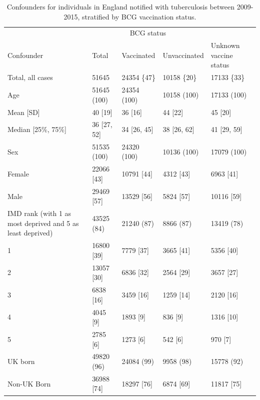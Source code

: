 \documentclass[11pt,twoside]{bristolthesis}
\begin{document}
  \begin{table}[!h]
  
  \caption{\label{tab:06-demo-sum}Confounders for individuals in England notified with tuberculosis between 2009-2015,  stratified by BCG vaccination status.}
  \centering
  \fontsize{8}{10}\selectfont
  \begin{tabular}{>{\raggedright\arraybackslash}p{2cm}llll}
  \toprule
  \multicolumn{2}{c}{ } & \multicolumn{3}{c}{BCG status} \\
  \cmidrule(l{3pt}r{3pt}){3-5}
  Confounder & Total & Vaccinated & Unvaccinated & Unknown vaccine status\\
  \midrule
  Total, all cases & 51645 & 24354 \{47\} & 10158 \{20\} & 17133 \{33\}\\
  Age & 51645 (100) & 24354 (100) & 10158 (100) & 17133 (100)\\
  Mean [SD] & 40 [19] & 36 [16] & 44 [22] & 45 [20]\\
  Median [25\%, 75\%] & 36 [27, 52] & 34 [26, 45] & 38 [26, 62] & 41 [29, 59]\\
  Sex & 51535 (100) & 24320 (100) & 10136 (100) & 17079 (100)\\
  \addlinespace
  \hspace{1em}Female & 22066 [43] & 10791 [44] & 4312 [43] & 6963 [41]\\
  \hspace{1em}Male & 29469 [57] & 13529 [56] & 5824 [57] & 10116 [59]\\
  IMD rank (with 1 as most deprived and 5 as least deprived) & 43525 (84) & 21240 (87) & 8866 (87) & 13419 (78)\\
  \hspace{1em}1 & 16800 [39] & 7779 [37] & 3665 [41] & 5356 [40]\\
  \hspace{1em}2 & 13057 [30] & 6836 [32] & 2564 [29] & 3657 [27]\\
  \addlinespace
  \hspace{1em}3 & 6838 [16] & 3459 [16] & 1259 [14] & 2120 [16]\\
  \hspace{1em}4 & 4045 [9] & 1893 [9] & 836 [9] & 1316 [10]\\
  \hspace{1em}5 & 2785 [6] & 1273 [6] & 542 [6] & 970 [7]\\
  UK born & 49820 (96) & 24084 (99) & 9958 (98) & 15778 (92)\\
  \hspace{1em}Non-UK Born & 36988 [74] & 18297 [76] & 6874 [69] & 11817 [75]\\

\end{tabular}
\end{table}
\end{document}
